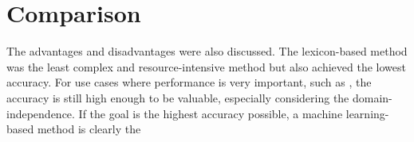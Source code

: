 \fi

\section{Comparison}

The advantages and disadvantages were also discussed. The lexicon-based method was the least complex and resource-intensive method but also achieved the lowest accuracy. For use cases where performance is very important, such as , the accuracy is still high enough to be valuable, especially considering the domain-independence. If the goal is the highest accuracy possible, a machine learning-based method is clearly the 


